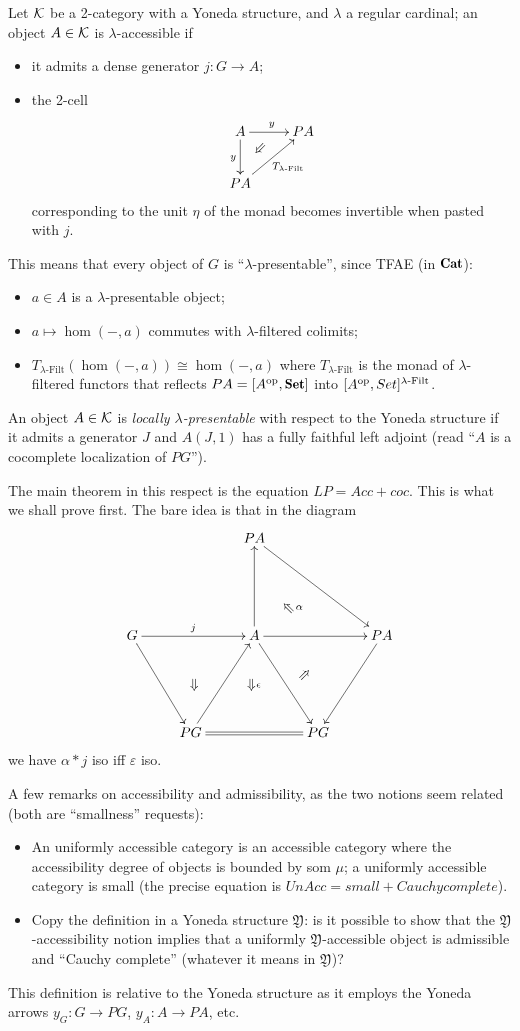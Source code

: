 \documentclass[a4paper,11pt]{amsart}
\begin{document}
Let $\mathcal{K}$ be a 2-category with a Yoneda structure, and $\lambda$ a regular cardinal; an object $A\in\mathcal{K}$ is $\lambda$-accessible if 
\begin{itemize}
	\item it admits a dense generator $j : G \to A$;
	\item the 2-cell
\[
\xymatrix{
	A \ar@{}[dr]|(.3)\Swarrow\ar[r]^y \ar[d]_y & PA \\
	PA \ar[ur]_{T_{\lambda\text{-Filt}}} & 
}
\]
corresponding to the unit $\eta$ of the monad becomes invertible when pasted with $j$.
\end{itemize}
This means that every object of $G$ is ``$\lambda$-presentable'', since TFAE (in $\Cat$):
\begin{itemize}
	\item $a\in A$ is a $\lambda$-presentable object;
	\item $a\mapsto \hom(-,a)$ commutes with $\lambda$-filtered colimits;
	\item $T_{\lambda\text{-Filt}}(\hom(-,a))\cong \hom(-,a)$ where $T_{\lambda\text{-Filt}}$ is the monad of $\lambda$-filtered functors that reflects $PA=[A^\opp,\Set]$ into $[A^{\text{op}},Set]^{\lambda\text{-Filt}}$.
\end{itemize}
\begin{remark}
An object $A\in\mathcal{K}$ is \emph{locally $\lambda$-presentable} with respect to the Yoneda structure if it admits a generator $J$ and $A(J,1)$ has a fully faithful left adjoint (read ``$A$ is a cocomplete localization of $PG$'').

The main theorem in this respect is the equation $LP = Acc + coc$. This is what we shall prove first. The bare idea is that in the diagram
\[
\xymatrix@R=2cm{
&& PA \ar[drr]&& \\ 
G \ar[rr]^j\ar[dr]&& A
\ar@{}[urr]|(.3){\Nwarrow\alpha}
\ar@{}[drr]|(.4)\Nearrow
\ar@{}[dll]|\Sarrow
\ar@{}[d]|{\Sarrow\;\epsilon}
\ar[dr]\ar[u]\ar[rr]&& PA\ar[dl] \\
& PG \ar[ur]\ar@{=}[rr]&& PG &
}
\]
we have $\alpha * j$ iso iff $\varepsilon$ iso.

A few remarks on accessibility and admissibility, as the two notions seem related (both are ``smallness'' requests):
\begin{itemize}
	\item An uniformly accessible category is an accessible category where the accessibility degree of objects is bounded by som $\mu$; a uniformly accessible category is small (the precise equation is $UnAcc = small + Cauchy complete$). 
	\item Copy the definition in a Yoneda structure $\mathfrak Y$: is it possible to show that the $\mathfrak Y$-accessibility notion implies that a uniformly $\mathfrak Y$-accessible object is admissible and ``Cauchy complete'' (whatever it means in $\mathfrak Y$)?
\end{itemize}

\end{remark}
This definition is relative to the Yoneda structure as it employs the Yoneda arrows $y_G : G \to PG$, $y_A : A \to PA$, etc.
{}

\end{document}
